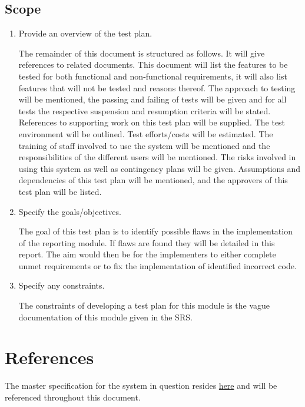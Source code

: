 \subsection{Scope}
\begin{enumerate}
	\item Provide an overview of the test plan.
		
The remainder of this document is structured as follows. It will give references to related documents. This document will   list the features to be tested for both functional and non-functional requirements, it will also list features that will not be tested and reasons thereof. The approach to testing will be mentioned, the passing and failing of tests will be given and for all tests the respective suspension and resumption criteria will be stated. References to supporting work on this test plan will be supplied. The test environment will be outlined. Test efforts/costs will be estimated. The training of staff involved to use the system will be mentioned and the responsibilities of the different users will be mentioned. The risks involved in using this system as well as contingency plans will be given. Assumptions and dependencies of this test plan will be mentioned, and the approvers of this test plan will be listed.

	\item Specify the goals/objectives.

The goal of this test plan is to identify possible flaws in the implementation of the reporting module. If flaws are found they will be detailed in this report. The aim would then be for the implementers to either complete unmet requirements or to fix the implementation of identified incorrect code.

	\item Specify any constraints.

The constraints of developing a test plan for this module is the vague documentation of this module given in the SRS. 
\end{enumerate} 
\section{References} 
\hypersetup{
	linkcolor = blue       
}   
The master specification for the system in question resides \href{https://clickup.up.ac.za/bbcswebdav/pid-791422-dt-content-rid-8256558_1/xid-8256558_1}{here} and will be referenced throughout this document.

